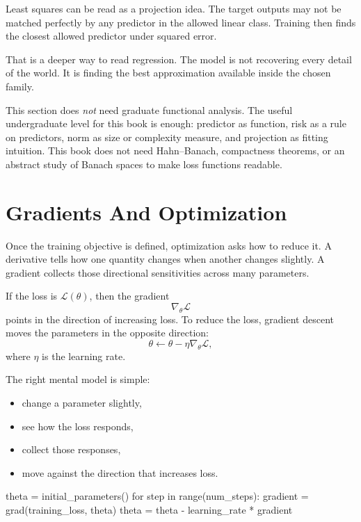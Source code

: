 Least squares can be read as a projection idea. The target outputs may not be matched perfectly by any predictor in the allowed linear class. Training then finds the closest allowed predictor under squared error.

That is a deeper way to read regression. The model is not recovering every detail of the world. It is finding the best approximation available inside the chosen family.

\begin{advancednote}
This section does \emph{not} need graduate functional analysis. The useful undergraduate level for this book is enough: predictor as function, risk as a rule on predictors, norm as size or complexity measure, and projection as fitting intuition. This book does not need Hahn--Banach, compactness theorems, or an abstract study of Banach spaces to make loss functions readable.
\end{advancednote}

\section*{Gradients And Optimization}

Once the training objective is defined, optimization asks how to reduce it. A derivative tells how one quantity changes when another changes slightly. A gradient collects those directional sensitivities across many parameters.

If the loss is \(\mathcal{L}(\theta)\), then the gradient
\[
\nabla_\theta \mathcal{L}
\]
points in the direction of increasing loss. To reduce the loss, gradient descent moves the parameters in the opposite direction:
\[
\theta \leftarrow \theta - \eta \nabla_\theta \mathcal{L},
\]
where \(\eta\) is the learning rate.

The right mental model is simple:

\begin{itemize}[leftmargin=*]
\item change a parameter slightly,
\item see how the loss responds,
\item collect those responses,
\item move against the direction that increases loss.
\end{itemize}

\begin{codeexample}
theta = initial_parameters()
for step in range(num_steps):
    gradient = grad(training_loss, theta)
    theta = theta - learning_rate * gradient
\end{codeexample}

